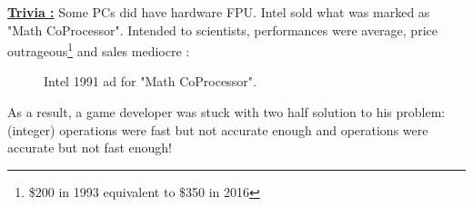 \documentclass[book.tex]{subfiles}
\begin{document}
\textbf{\underline{Trivia :}} Some PCs did have hardware FPU. Intel sold what was marked as "Math CoProcessor". Intended to scientists, performances were average, price outrageous\footnote{\$200 in 1993 equivalent to \$350 in 2016} and sales mediocre :\\
\begin{figure}[H]
\centering
\caption{Intel 1991 ad for "Math CoProcessor".}
\label{fig:fp_internals}
\end{figure}



\par
As a result, a game developer was stuck with two half solution to his problem: (integer) operations were fast but not accurate enough and  operations were accurate but not fast enough!
  
\end{document}
